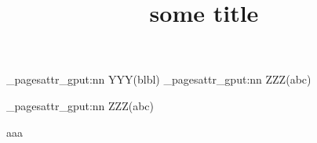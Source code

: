 \documentclass{article}
\title{some title}
\begin{document}
\parskip=1cm
%
\ExplSyntaxOn
\pdf_pagesattr_gput:nn {YYY}{(blbl)}
{\pdf_pagesattr_gput:nn {ZZZ}{(abc)}}

%
\pdf_pagesattr_gput:nn {ZZZ}{(abc)}
\ExplSyntaxOff
 
aaa
\end{document}
